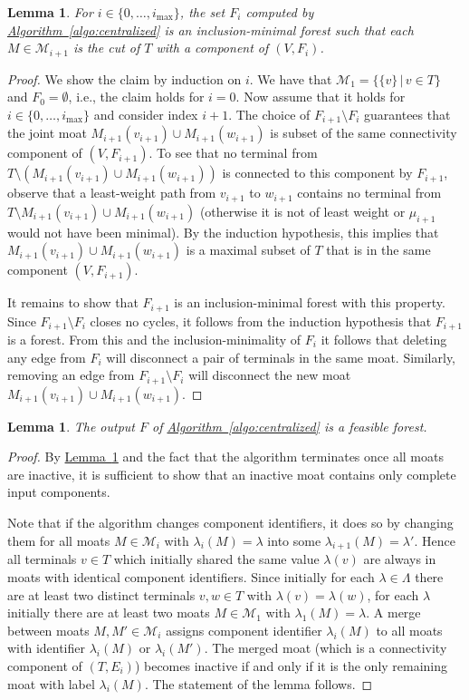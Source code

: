 \documentclass[letterpaper,11pt]{article}
\newtheorem{lemma}[theorem]{Lemma}
\newcommand{\namedref}[2]{\hyperref[#2]{#1~\ref*{#2}}}
\newcommand{\lemmaref}[1]{\namedref{Lemma}{#1}}
\newcommand{\algref}[1]{\namedref{Algorithm}{#1}}
\newcommand{\M}{\mathcal{M}}
\newcommand{\Comp}{\lambda}
\begin{document}
\begin{lemma}\label{lemma:components}
For $i\in \{0,\ldots,i_{\max}\}$, the set $F_i$ computed by
\algref{algo:centralized} is an inclusion-minimal forest such that each $M\in
\M_{i+1}$ is the cut of $T$ with a component of $(V,F_i)$.
\end{lemma}
\begin{proof} We show the claim by induction on $i$. We have that $\M_1=\{\{v\}\,|\,v\in T\}$
and $F_0=\emptyset$, i.e., the claim holds for $i=0$. Now assume that it holds
for $i\in \{0,\ldots,i_{\max}\}$ and consider index $i+1$. The choice of
$F_{i+1}\setminus F_i$ guarantees that the joint moat
$M_{i+1}(v_{i+1})\cup M_{i+1}(w_{i+1})$ is subset of the same connectivity
component of $(V,F_{i+1})$. To see that no terminal from $T\setminus
(M_{i+1}(v_{i+1})\cup M_{i+1}(w_{i+1}))$ is connected to this component by
$F_{i+1}$, observe that a least-weight path from $v_{i+1}$ to $w_{i+1}$ contains
no terminal from $T\setminus M_{i+1}(v_{i+1})\cup M_{i+1}(w_{i+1})$ (otherwise
it is not of least weight or $\mu_{i+1}$ would not have been minimal). By the
induction hypothesis, this implies that $M_{i+1}(v_{i+1})\cup M_{i+1}(w_{i+1})$
is a maximal subset of $T$ that is in the same component $(V,F_{i+1})$.

It remains to show that $F_{i+1}$ is an inclusion-minimal forest with this
property. Since $F_{i+1}\setminus F_i$ closes no cycles, it follows from the
induction hypothesis that $F_{i+1}$ is a forest. From this and the
inclusion-minimality of $F_i$ it follows that deleting any edge from $F_i$ will
disconnect a pair of terminals in the same moat. Similarly, removing an edge
from $F_{i+1}\setminus F_i$ will disconnect the new moat $M_{i+1}(v_{i+1})\cup
M_{i+1}(w_{i+1})$.
\end{proof}

\begin{lemma}\label{lemma:feasible}
The output $F$ of \algref{algo:centralized} is a feasible forest.
\end{lemma}
\begin{proof}
By \lemmaref{lemma:components} and the fact that the algorithm terminates once
all moats are inactive, it is sufficient to show that an inactive moat contains
only complete input components.

Note that if the algorithm changes component identifiers, it does so by changing
them for all moats $M\in \M_i$ with $\Comp_i(M)=\lambda$ into some
$\Comp_{i+1}(M)=\lambda'$. Hence all terminals $v\in T$ which initially shared
the same value $\lambda(v)$ are always in moats with identical component
identifiers. Since initially for each $\Comp \in \Lambda$ there are at least two
distinct terminals $v,w\in T$ with $\Comp(v)=\Comp(w)$, for each $\Comp$
initially there are at least two moats $M\in \M_1$ with $\Comp_1(M)=\Comp$. A
merge between moats $M,M'\in \M_i$ assigns component identifier $\Comp_i(M)$ to
all moats with identifier $\Comp_i(M)$ or $\Comp_i(M')$. The merged moat (which
is a connectivity component of $(T,E_i)$) becomes inactive if and only if it is
the only remaining moat with label $\Comp_i(M)$. The statement of the lemma
follows.
\end{proof}
\end{document}
